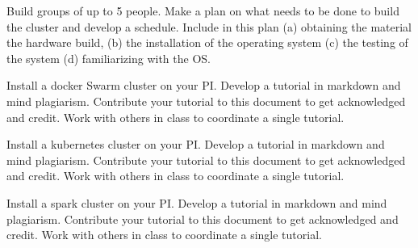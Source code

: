 \begin{exercise}

\label{E:.Pi.Cluster.Build} Build groups of up to 5 people. Make a
  plan on what needs to be done to build the cluster and develop a
  schedule. Include in this plan (a) obtaining the material the
  hardware build, (b) the installation of the operating system (c) the
  testing of the system (d) familiarizing with the OS.
\end{exercise}

\begin{exercise}

  \label{E:.Pi.Cluster.DockerSwarm} Install a docker Swarm cluster on
  your PI. Develop a tutorial in markdown and mind
  plagiarism. Contribute your tutorial to this document to get
  acknowledged and credit. Work with others in class to coordinate a
  single tutorial.
\end{exercise}

\begin{exercise}

  \label{E:.Pi.Cluster.Kubernetes} Install a kubernetes cluster on
  your PI. Develop a tutorial in markdown and mind
  plagiarism. Contribute your tutorial to this document to get
  acknowledged and credit. Work with others in class to coordinate a
  single tutorial.
\end{exercise}
  
\begin{exercise}
  \label{E:.Pi.Cluster.Spark} Install a spark cluster on your
  PI. Develop a tutorial in markdown and mind plagiarism. Contribute
  your tutorial to this document to get acknowledged and credit. Work
  with others in class to coordinate a single tutorial.
\end{exercise}


